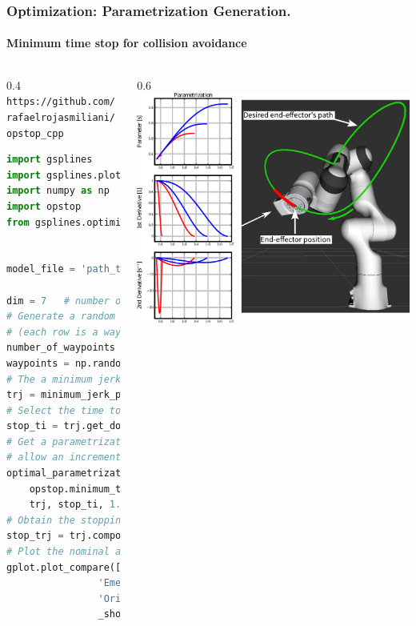 \begin{frame}[fragile]
	\frametitle{Optimization: Parametrization Generation.}
	\framesubtitle{Minimum time stop for collision avoidance}
	\begin{columns}
		\begin{column}{0.4\textwidth}
			{\fontsize{5}{4}\selectfont\Verb|https://github.com/rafaelrojasmiliani/opstop_cpp|}
			\begin{lstlisting}[language=python,
            ]
import gsplines
import gsplines.plot as gplot
import numpy as np
import opstop
from gsplines.optimization import minimum_jerk_path


model_file = 'path_to_urdf_robot_description'

dim = 7   # number of joints of the robot
# Generate a random numpy array of wayponts
# (each row is a waypoint in R^n)
number_of_waypoints = 5
waypoints = np.random.rand(number_of_waypoints, dim)
# The a minimum jerk trajectory with execution time of 5s
trj = minimum_jerk_path(waypoints)
# Select the time to stop as the 60% of the time.
stop_ti = trj.get_domain()[1]*0.6
# Get a parametrization that minimizes the time and  does not
# allow an increment in the acceleration larger than 50%
optimal_parametrization = \
    opstop.minimum_time_bounded_acceleration(
    trj, stop_ti, 1.5, str(model_file), 8)
# Obtain the stopping trajectory
stop_trj = trj.compose(optimal_parametrization)
# Plot the nominal and the stopping trajectory
gplot.plot_compare([stop_trj, trj], ['red', 'blue'], [
                'Emergency Stop Trajectory',
                'Original Trajectory'], 
                _show=True, _up_to_deriv=2)
    \end{lstlisting}
		\end{column}
		\begin{column}{0.6\textwidth}
			\includegraphics[width=\textwidth]{./images/opstop_param.pdf}
		\end{column}
	\end{columns}
\end{frame}

